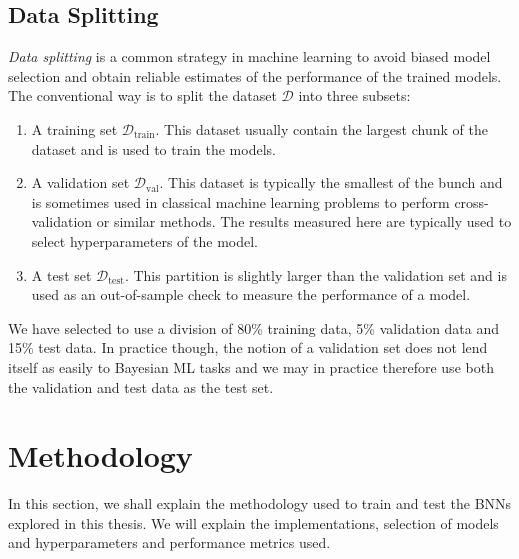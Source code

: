 \subsection{Data Splitting}
\textit{Data splitting} is a common strategy in machine learning to avoid biased model selection and obtain reliable estimates of the performance of the trained models.
The conventional way is to split the dataset $\mathcal{D}$ into three subsets: 
\begin{enumerate}
    \item A training set $\mathcal{D}_\text{train}$. This dataset usually contain the largest chunk of the dataset and is used to train the models.
    \item A validation set $\mathcal{D}_\text{val}$. This dataset is typically the smallest of the bunch and is sometimes used in classical machine learning problems to perform cross-validation or similar methods. The results measured here are typically used to select hyperparameters of the model.
    \item A test set $\mathcal{D}_\text{test}$. This partition is slightly larger than the validation set and is used as an out-of-sample check to measure the performance of a model. 
\end{enumerate}
We have selected to use a division of 80\% training data, 5\% validation data and 15\% test data. In practice though, the notion of a validation set does not lend itself as easily to Bayesian ML tasks and we may in practice therefore use both the validation and test data as the test set.

\section{Methodology}
In this section, we shall explain the methodology used to train and test the BNNs explored in this thesis. We will explain the implementations, selection of models and hyperparameters and performance metrics used.

